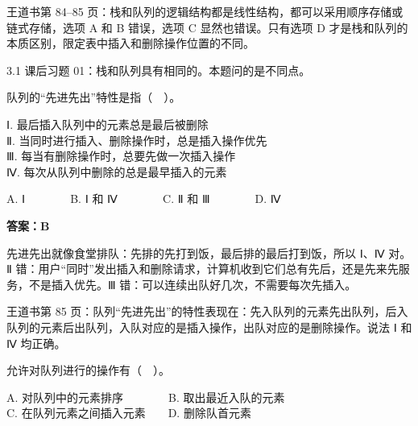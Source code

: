 \documentclass[10.5pt,a4paper,oneside]{article}
\newcommand{\hlred}[1]{\textcolor{wdred}{\bfseries #1}}
\newcommand{\uln}[1]{\CJKunderline[format=\color{wdred},thickness=0.9pt,depth=0.28em]{#1}}
\begin{document}
\begin{jiexibox}

王道书第 84--85
页：栈和队列的逻辑结构都是线性结构，都可以采用顺序存储或链式存储，选项 A
和 B 错误，选项 C 显然也错误。只有选项 D
才是栈和队列的本质区别，限定表中插入和删除操作位置的不同。

\end{jiexibox}

\begin{recallbox}

3.1 课后习题 01：栈和队列具有相同的\uln{逻辑结构}。本题问的是不同点。

\end{recallbox}

\begin{questionbox}[02]

队列的“先进先出”特性是指（　）。

Ⅰ. 最后插入队列中的元素总是最后被删除\\
Ⅱ. 当同时进行插入、删除操作时，总是插入操作优先\\
Ⅲ. 每当有删除操作时，总要先做一次插入操作\\
Ⅳ. 每次从队列中删除的总是最早插入的元素

A. Ⅰ　　　　B. Ⅰ 和 Ⅳ　　　　C. Ⅱ 和 Ⅲ　　　　D. Ⅳ

\end{questionbox}

\hlred{\textbf{答案：B}}

\begin{videobox}

先进先出就像食堂排队：先排的先打到饭，最后排的最后打到饭，所以 Ⅰ、Ⅳ
对。Ⅱ
错：用户“同时”发出插入和删除请求，计算机收到它们总有先后，还是先来先服务，不是插入优先。Ⅲ
错：可以连续出队好几次，不需要每次先插入。

\end{videobox}

\begin{jiexibox}

王道书第 85
页：队列“先进先出”的特性表现在：先入队列的元素先出队列，后入队列的元素后出队列，入队对应的是插入操作，出队对应的是删除操作。说法
Ⅰ 和 Ⅳ 均正确。

\end{jiexibox}

\begin{questionbox}[03]

允许对队列进行的操作有（　）。

A. 对队列中的元素排序　　　　B. 取出最近入队的元素\\
C. 在队列元素之间插入元素　　D. 删除队首元素

\end{questionbox}
\end{document}
